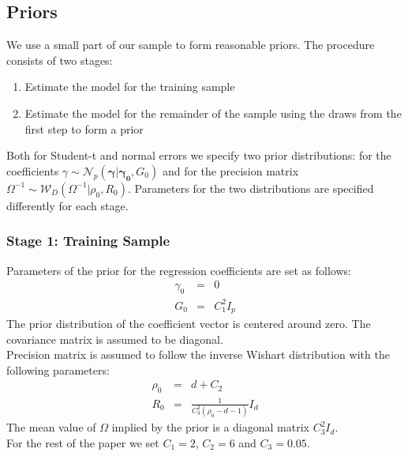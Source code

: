 \documentclass[12pt]{article}
\begin{document}
\subsection{Priors}
We use a small part of our sample to form reasonable priors. The procedure consists of two stages:
\begin{enumerate}
	\item Estimate the model for the training sample
	\item Estimate the model for the remainder of the sample using the draws from the first step to form a prior
\end{enumerate}
Both for Student-t and normal errors we specify two prior distributions: for the coefficients $\gamma \sim \mathcal{N}_{p}\left( \boldsymbol{\gamma} |\boldsymbol{\gamma_{0}},G_{0}\right)$ and for the precision matrix $\Omega^{-1} \sim \mathcal{W}_{D}  \left(\Omega ^{-1}|\rho_{0}, R_{0}\right) $. Parameters for the two distributions are specified differently for each stage.


\subsubsection{Stage 1: Training Sample}
Parameters of the prior for the regression coefficients are set as follows:
\begin{eqnarray*}
	\gamma_{0} &=& 0 \\ 
	G_{0} &=& C_{1}^{2}I_{p} 
\end{eqnarray*}
The prior distribution of the coefficient vector is centered around zero. The covariance matrix is assumed to be diagonal.\\
Precision matrix is assumed to follow the inverse Wishart distribution with the following parameters:
\begin{eqnarray*}
	\rho_{0} &=& d + C_{2} \\ 
	R_{0} &=& \frac{1}{C_{3}^{2} (\rho_{0}-d-1)}I_{d}
\end{eqnarray*}
The mean value of $\Omega$ implied by the prior is a diagonal matrix $C_{3}^{2}I_{d}$.\\
For the rest of the paper we set $C_{1} = 2$, $C_{2} = 6$ and $C_{3} = 0.05$.\\
\end{document}
